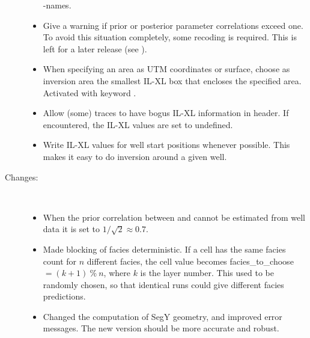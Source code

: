 \begin{description}
\begin{itemize}
      \crava-names. 
    \item Give a warning if prior or posterior parameter correlations
      exceed one. To avoid this situation completely, some recoding is
      required. This is left for a later release (see
      ). 
    \item When specifying an area as UTM coordinates or surface,
      choose as inversion area the smallest IL-XL box that
      encloses the specified area. Activated with keyword
      . 
    \item Allow (some) traces to have bogus IL-XL information in
      header. If encountered, the IL-XL values are set to
      undefined. 
    \item Write IL-XL values for well start positions whenever
      possible. This makes it easy to do inversion around a given
      well. 
 \end{itemize}

\item [Changes:] \mbox{ }
  \begin{itemize}
    \item When the prior correlation between \vp and \vs cannot be
      estimated from well data it is set to $1/\sqrt{2}\approx
      0.7$. 
    \item Made blocking of facies deterministic. If a cell has the
      same facies count for $n$ different facies, the cell value
      becomes facies\_to\_choose $= (k + 1)\ \%\ n$, where $k$ is the
      layer number. This used to be randomly chosen, so that identical
      runs could give different facies predictions. 
    \item Changed the computation of SegY geometry, and improved error messages. The new version should be more accurate and robust.
  \end{itemize}


\end{description}
